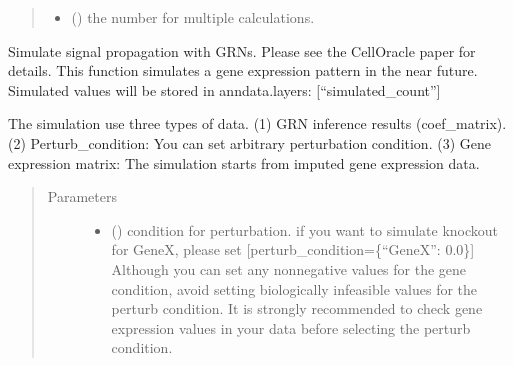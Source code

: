 \documentclass[letterpaper,10pt,english]{sphinxmanual}
\begin{document}
\begin{fulllineitems}
\begin{fulllineitems}
\begin{quote}
\begin{description}
\begin{itemize}
\item {} 
 () \textendash{} the number for multiple calculations.

\end{itemize}

\end{description}\end{quote}

\end{fulllineitems}


\begin{fulllineitems}
\label{\detokenize{modules/celloracle:celloracle.Oracle.simulate_shift}}
Simulate signal propagation with GRNs. Please see the CellOracle paper for details.
This function simulates a gene expression pattern in the near future.
Simulated values will be stored in anndata.layers: {[}“simulated\_count”{]}

The simulation use three types of data.
(1) GRN inference results (coef\_matrix).
(2) Perturb\_condition: You can set arbitrary perturbation condition.
(3) Gene expression matrix: The simulation starts from imputed gene expression data.
\begin{quote}\begin{description}
\item[{Parameters}] \leavevmode\begin{itemize}
\item {} 
 () \textendash{} condition for perturbation.
if you want to simulate knockout for GeneX, please set {[}perturb\_condition=\{“GeneX”: 0.0\}{]}
Although you can set any non\sphinxhyphen{}negative values for the gene condition, avoid setting biologically infeasible values for the perturb condition.
It is strongly recommended to check gene expression values in your data before selecting the perturb condition.


\end{itemize}
\end{description}
\end{quote}
\end{fulllineitems}
\end{fulllineitems}
\end{document}
